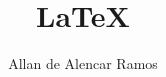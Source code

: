 \documentclass[12pt, a4paper]{article}
\begin{document}
\title{LaTeX}
\author{Allan de Alencar Ramos} 
\maketitle
\end{document}
